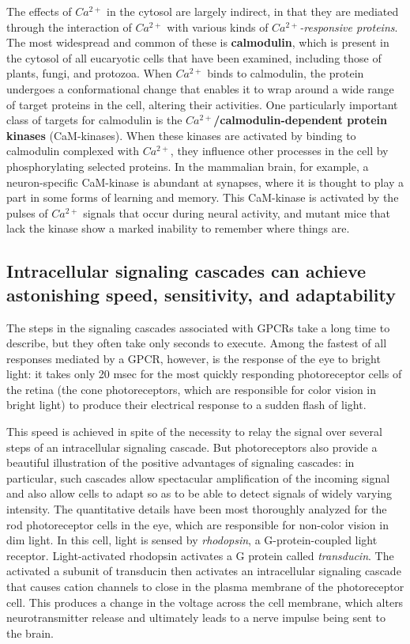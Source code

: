 The effects of $Ca^{2+}$ in the cytosol are largely indirect, in that they are mediated
through the interaction of $Ca^{2+}$ with various kinds of \textit{$Ca^{2+}$-responsive
proteins}. The most widespread and common of these is \textbf{calmodulin},
which is present in the cytosol of all eucaryotic cells that have been examined,
including those of plants, fungi, and protozoa. When $Ca^{2+}$ binds to
calmodulin, the protein undergoes a conformational change that enables
it to wrap around a wide range of target proteins in the cell, altering their
activities. One particularly important class of targets for
calmodulin is the \textbf{$Ca^{2+}$/calmodulin-dependent protein kinases} (CaM-kinases).
When these kinases are activated by binding to calmodulin
complexed with $Ca^{2+}$, they influence other processes in the cell by phosphorylating
selected proteins. In the mammalian brain, for example, a
neuron-specific CaM-kinase is abundant at synapses, where it is thought
to play a part in some forms of learning and memory. This CaM-kinase is
activated by the pulses of $Ca^{2+}$ signals that occur during neural activity,
and mutant mice that lack the kinase show a marked inability to remember
where things are.

\subsection{Intracellular signaling cascades can achieve astonishing speed, sensitivity, and adaptability}

The steps in the signaling cascades associated with GPCRs take a long
time to describe, but they often take only seconds to execute.
Among the fastest of all responses
mediated by a GPCR, however, is the response of the eye to bright light:
it takes only 20 msec for the most quickly responding photoreceptor cells
of the retina (the cone photoreceptors, which are responsible for color
vision in bright light) to produce their electrical response to a sudden
flash of light.

This speed is achieved in spite of the necessity to relay the signal over
several steps of an intracellular signaling cascade. But photoreceptors
also provide a beautiful illustration of the positive advantages of signaling
cascades: in particular, such cascades allow spectacular amplification
of the incoming signal and also allow cells to adapt so as to be able to
detect signals of widely varying intensity. The quantitative details have
been most thoroughly analyzed for the rod photoreceptor cells in the eye,
which are responsible for non-color vision in dim light. In
this cell, light is sensed by \textit{rhodopsin}, a G-protein-coupled light receptor.
Light-activated rhodopsin activates a G protein called \textit{transducin}. The
activated a subunit of transducin then activates an intracellular signaling
cascade that causes cation channels to close in the plasma membrane
of the photoreceptor cell. This produces a change in the voltage across
the cell membrane, which alters neurotransmitter release and ultimately
leads to a nerve impulse being sent to the brain.


